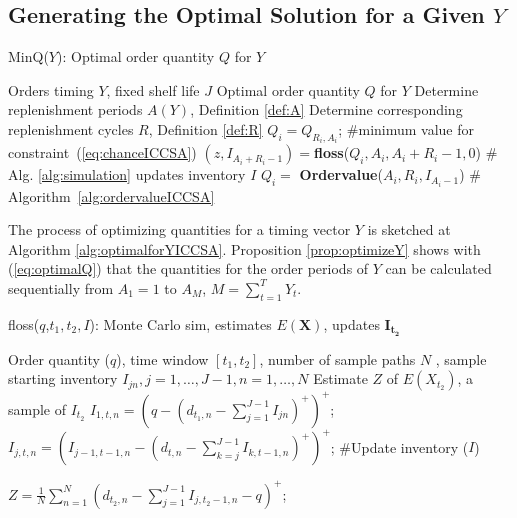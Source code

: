 \subsection{Generating the Optimal Solution for a Given $Y$}
\begin{algorithm}[h]
	\caption{MinQ($Y$): Optimal order quantity $Q$ for $Y$}
	\label{alg:optimalforYICCSA}
	\begin{algorithmic}[1]
        \REQUIRE Orders timing $Y$, fixed shelf life $J$ 
        \ENSURE Optimal order quantity $Q$ for $Y$
        \medskip
		\STATE Determine replenishment periods $A(Y)$, Definition \ref{def:A} 
        \STATE Determine corresponding replenishment cycles $R$, Definition \ref{def:R} 
		\STATE $Q_i=Q_{R_i,A_i}$; \label{optimalforY:line:beforeflossICCSA} \hfill \#minimum value for constraint~(\ref{eq:chanceICCSA})
		\STATE  $(z,I_{A_i+R_i-1})=$\textbf{floss}($Q_i,A_i,A_i+R_i-1,0$) \label{optimalforY:line:flossICCSA} \hfill \# Alg. \ref{alg:simulation} updates inventory $I$
		\ELSE
        \STATE $Q_i=$ \textbf{Ordervalue}($A_i,R_i,I_{A_i-1}$) \hfill \# Algorithm~\ref{alg:ordervalueICCSA}
		\ENDIF
		\ENDFOR
		\vskip 5pt
	\end{algorithmic}
	
\end{algorithm}
The process of optimizing quantities for a timing vector $Y$ is sketched at Algorithm \ref{alg:optimalforYICCSA}. Proposition \ref{prop:optimizeY} shows with (\ref{eq:optimalQ}) that the quantities for the order periods of $Y$ can be calculated sequentially from $A_1=1$  to $A_M$, $M=\sum\limits_{t=1}^{T}Y_t$. 
\begin{algorithm}[h]
	\caption{floss($q$,$t_1,t_2,I$): Monte Carlo sim, estimates  $E(\boldsymbol{X})$, updates $\boldsymbol{I_{t_2}}$}
	\label{alg:simulationICCSA}
	\begin{algorithmic}[1]
        \REQUIRE Order quantity ($q$), time window $[t_1,t_2]$, number of sample paths $N$%
        , sample starting inventory $I_{jn}, j=1,\ldots,J-1, n=1,\ldots,N$%
        \ENSURE  Estimate $Z$ of $E(X_{t_2})$, a sample of $I_{t_2}$
        \medskip
		\FOR{$n=1$ \textbf{to} $N$}
		\STATE $I_{1,t,n}= \left(q - (d_{t_1,n}-\sum_{j=1}^{J-1}I_{jn})^+\right)^+$; %
			\FOR{$t=t_1$ \textbf{to} $t_2$}
				\FOR{$j=2$ \textbf{to} $j=J-1$ }
					\STATE $I_{j,t,n}= \left(I_{j-1,t-1,n} - (d_{t,n}-\sum_{k=j}^{J-1}I_{k,t-1,n})^+\right)^+$; \hfill \#Update inventory ($I$)
				\ENDFOR
				\ENDFOR
				
				\STATE $Z=\frac{1}{N}\sum\limits_{n=1}^{N} \left(d_{t_2,n}-\sum_{j=1}^{J-1}I_{j,t_2-1,n}-q\right)^+$; \hfill %
		\ENDFOR
		\vskip 5pt
	\end{algorithmic}
	
\end{algorithm}
